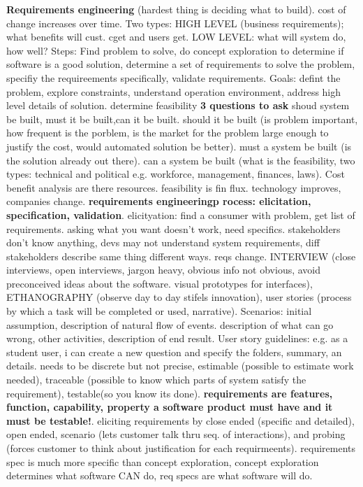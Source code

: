 \documentclass[10pt]{article}
\begin{document}
\begin{landscape}
\begin{multicols*}{6}
\textbf{Requirements engineering} (hardest thing is deciding what to build). cost of change increases over time. Two types: HIGH LEVEL (business requirements); what benefits will cust. cget and users get. LOW LEVEL: what will system do, how well?
Steps: Find problem to solve, do concept exploration to determine if software is a good solution, determine a set of requirements to solve the problem, specifiy the requireements specifically, validate requirements.
Goals: defint the problem, explore constraints, understand operation environment, address high level details of solution. determine feasibility \textbf{3 questions to ask} shoud system be built, must it be built,can it be built. should it be built (is problem important, how frequent is the porblem, is the market for the problem large enough to justify the cost, would automated solution be better). must a system be built (is the solution already out there). can a system be built (what is the feasibility, two types: technical and political e.g. workforce, management, finances, laws). Cost benefit analysis are there resources. feasibility is fin flux. technology improves, companies change. \textbf{requirements engineeringp rocess: elicitation, specification, validation}. elicityation: find a consumer with problem, get list of requirements. asking what you want doesn't work, need specifics. stakeholders don't know anything, devs may not understand system requirements, diff stakeholders describe same thing different ways. reqs change. INTERVIEW (close interviews, open interviews, jargon heavy, obvious info not obvious, avoid preconceived ideas about the software. visual prototypes for interfaces), ETHANOGRAPHY (observe day to day stifels innovation), user stories (process by which a task will be completed or used, narrative). Scenarios: initial assumption, description of natural flow of events. description of what can go wrong, other activities, description of end result.
User story guidelines: e.g. as a student user, i can create a new question and specify the folders, summary, an details. needs to be discrete but not precise, estimable (possible to estimate work needed), traceable (possible to know which parts of system satisfy the requirement), testable(so you know its done). \textbf{requirements are features, function, capability, property a software product must have and it must be testable!}. eliciting requirements by close ended (specific and detailed), open ended, scenario (lets customer talk thru seq. of interactions), and probing (forces customer to think about justification for each requirmeents). requirements spec is much more specific than concept exploration, concept exploration determines what software CAN do, req specs are what software will do.

\end{multicols*}
\end{landscape}
\end{document}
